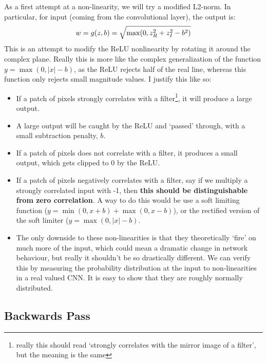 	\begin{figure}[!h]
    \centering
    
	\end{figure}
	
	As a first attempt at a non-linearity, we will try a modified L2-norm. In 
  particular, for input \SigIn (coming from the convolutional layer), the
  output \SigOut is:
	$$\SigOut = g(\SigIn, b) = \sqrt{\max(0, \SigIn_R^2 + \SigIn_I^2 - b^2)}$$
  This is an attempt to modify the ReLU nonlinearity by rotating it
  around the complex plane. Really this is more like the complex generalization
  of the function $y = \max(0, |x| -b)$, as the ReLU rejects half of the real
  line, whereas this function only rejects small magnitude values. I justify
  this like so:
  \begin{itemize}
    \item If a patch of pixels strongly correlates with
      a filter\footnote{really this should read `strongly correlates with the
      mirror image of a filter', but the meaning is the same}, it will
      produce a large output. 
    \item A large output will be caught by the ReLU and `passed' through, with
      a small subtraction penalty, $b$.
    \item If a patch of pixels does not correlate with a filter, it produces
      a small output, which gets clipped to 0 by the ReLU.
    \item If a patch of pixels negatively correlates with a filter, say if we
      multiply a strongly correlated input with -1, then
      \textbf{this should be distinguishable from zero correlation}. A way to
      do this would be use a soft limiting function ($y=\min(0,x+b)
      + \max(0,x-b)$), or the rectified version of the soft limiter
      ($y=\max(0,|x| - b)$.
    \item The only downside to these non-linearities is that they theoretically
      `fire' on much more of the input, which could mean a dramatic change in
      network behaviour, but really it shouldn't be so drastically different.
      We can verify this by measuring the probability distribution at the 
      input to non-linearities in a real valued CNN. It is easy to show that
      they are roughly normally distributed.
  \end{itemize}

\subsection*{Backwards Pass}  
  \renewcommand{\dataloss}{\ensuremath{\logloss_{\text{data}}}\xspace}
  \renewcommand{\SigIn}{\ensuremath{z}\xspace}
  \renewcommand{\SigOut}{\ensuremath{w}\xspace}
  \renewcommand{\Filter}{\ensuremath{f}\xspace}
  
